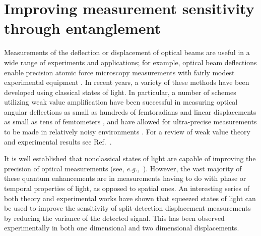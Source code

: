 \chapter{Improving measurement sensitivity through entanglement}\label{ch:biphotons}
Measurements of the deflection or displacement of optical beams are useful in a wide range of experiments and applications; for example, optical beam deflections enable precision atomic force microscopy measurements with fairly modest experimental equipment \cite{Putnam1992}.  
In recent years, a variety of these methods have been developed using classical states of light.  
In particular, a number of schemes utilizing weak value amplification have been successful in measuring optical angular deflections as small as hundreds of femtoradians and linear displacements as small as tens of femtometers \cite{Dixon2009}, and have allowed for ultra-precise measurements to be made in relatively noisy environments \cite{Hosten2008}. 
For a review of weak value theory and experimental results see Ref.~\cite{Dressel2014}. 

It is well established that nonclassical states of light are capable of improving the precision of optical measurements (see, \emph{e.g.,}~\cite{Agarwal2013,giovannetti2006}).  
However, the vast majority of these quantum enhancements are in measurements having to do with phase or temporal properties of light, as opposed to spatial ones.  
An interesting series of both theory and experimental works \cite{Fabre2000, Treps2002, Treps2003, Barnett2003} have shown that squeezed states of light can be used to improve the sensitivity of split-detection displacement measurements by reducing the variance of the detected signal.  
This has been observed experimentally in both one dimensional \cite{Treps2002} and two dimensional \cite{Treps2003} displacements. 


